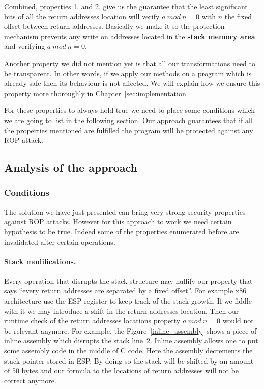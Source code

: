 \documentclass[11pt]{sdm}
\begin{document}
Combined, properties 1. and 2. give us the guarantee that the least significant bits of all the return addresses location will verify $a~mod~n=0$ with $n$ the fixed offset between return addresses.
Basically we make it so the protection mechanism prevents any write on addresses located in the \textbf{stack memory area} and verifying $a~mod~n=0$.

\hfill \break 
Another property we did not mention yet is that all our transformations need to be transparent. In other words, if we apply our methods on a program which is already safe then its behaviour is not affected. We will explain how we ensure this property more thoroughly in Chapter~\ref{sec:implementation}.

\hfill \break 
For these properties to always hold true we need to place some conditions which we are going to list in the following section. Our approach guarantees that if all the properties mentioned are fulfilled the program will be protected against any ROP attack.

\subsection{Analysis of the approach}
\label{sub:Analysis of the approach}

\subsubsection{Conditions}
\label{ssub:Conditions}

The solution we have just presented can bring very strong security properties against ROP attacks. However for this approach to work we need certain hypothesis to be true. Indeed some of the properties enumerated before are invalidated after certain operations.

\paragraph{Stack modifications.}
\label{par:Stack modifications}
Every operation that disrupts the stack structure may nullify our property that says ``every return addresses are separated by a fixed offset''. For example x86 architecture use the ESP register to keep track of the stack growth. If we fiddle with it we may introduce a shift in the return addresses location. Then our runtime check of the return addresses locations property $a~mod~n=0$ would not be relevant anymore.
		For example, the Figure~\ref{inline_assembly} shows a piece of inline assembly which disrupts the stack line~2. Inline assembly allows one to put some assembly code in the middle of C code. Here the assembly decrements the stack pointer stored in ESP. By doing so the stack will be shifted by an amount of 50 bytes and our formula to the locations of return addresses will not be correct anymore.
\end{document}
